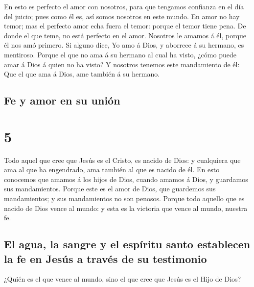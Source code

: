  En esto es perfecto el amor con nosotros, para que
tengamos confianza en el día del juicio; pues como él es, así somos
nosotros en este mundo.  En amor no hay temor; mas el
perfecto amor echa fuera el temor: porque el temor tiene pena. De donde
el que teme, no está perfecto en el amor.  Nosotros le
amamos á él, porque él nos amó primero.  Si alguno dice,
Yo amo á Dios, y aborrece á su hermano, es mentiroso. Porque el que no
ama á su hermano al cual ha visto, ¿cómo puede amar á Dios á quien no ha
visto?  Y nosotros tenemos este mandamiento de él: Que el
que ama á Dios, ame también á su hermano.

\hypertarget{fe-y-amor-en-su-uniuxf3n}{%
\subsection{Fe y amor en su unión}\label{fe-y-amor-en-su-uniuxf3n}}

\hypertarget{section-4}{%
\section{5}\label{section-4}}

 Todo aquel que cree que Jesús es el Cristo, es nacido de
Dios: y cualquiera que ama al que ha engendrado, ama también al que es
nacido de él.  En esto conocemos que amamos á los hijos de
Dios, cuando amamos á Dios, y guardamos sus mandamientos. 
Porque este es el amor de Dios, que guardemos sus mandamientos; y sus
mandamientos no son penosos.  Porque todo aquello que es
nacido de Dios vence al mundo: y esta es la victoria que vence al mundo,
nuestra fe.

\hypertarget{el-agua-la-sangre-y-el-espuxedritu-santo-establecen-la-fe-en-jesuxfas-a-travuxe9s-de-su-testimonio}{%
\subsection{El agua, la sangre y el espíritu santo establecen la fe en
Jesús a través de su
testimonio}\label{el-agua-la-sangre-y-el-espuxedritu-santo-establecen-la-fe-en-jesuxfas-a-travuxe9s-de-su-testimonio}}

 ¿Quién es el que vence al mundo, sino el que cree que
Jesús es el Hijo de Dios?

